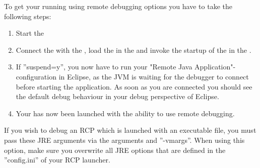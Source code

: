 To get your \gdaut{} running using remote debugging options you have to take the following steps:
\begin{enumerate}
 \item Start the \gdagent{}
 \item Connect the \ite{} with the \gdagent{}, load the \gdproject{} in the \ite{} and invoke the startup of the \gdaut{} in the \ite{}.
 \item If ''suspend=y'', you now have to run your "Remote Java Application"-configuration 
 in Eclipse, as the JVM is waiting for the debugger to connect before starting the 
 application. As soon as you are connected you should see the default debug behaviour in your
 debug perspective of Eclipse.
 \item Your \gdaut{} has now been launched with the ability to use remote debugging.  
\end{enumerate}

If you wish to debug an RCP \gdaut{}  which is launched with an 
executable file, you must pass these JRE arguments via the \gdaut{} arguments and ''-vmargs''. When using this option, make sure you overwrite all JRE options that are defined in the ''config.ini'' of your RCP launcher.
